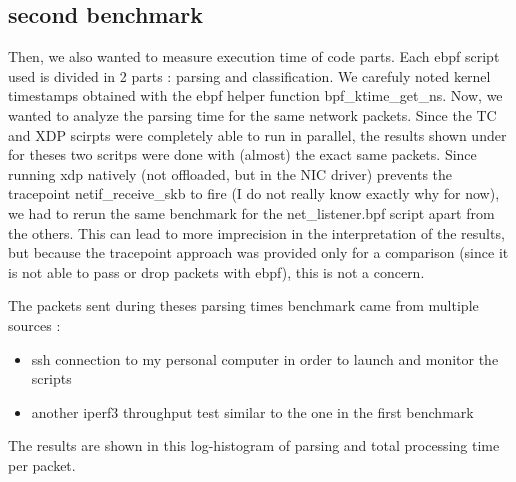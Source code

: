 \documentclass[conference]{IEEEtran}
\begin{document}
\subsection{second benchmark}
Then, we also wanted to measure execution time of code parts. Each ebpf script used is divided in 2 parts : parsing and classification. We carefuly noted kernel timestamps obtained with the ebpf helper function bpf\_ktime\_get\_ns. Now, we wanted to analyze the parsing time for the same network packets. Since the TC and XDP scirpts were completely able to run in parallel, the results shown under for theses two scritps were done with (almost) the exact same packets. Since running \gls{xdp} natively (not offloaded, but in the NIC driver) prevents the tracepoint netif\_receive\_skb to fire (I do not really know exactly why for now), we had to re\-run the same benchmark for the net\_listener.bpf script apart from the others. This can lead to more imprecision in the interpretation of the results, but because the tracepoint approach was provided only for a comparison (since it is not able to pass or drop packets with \gls{ebpf}), this is not a concern.

The packets sent during theses parsing times benchmark came from multiple sources :
\begin{itemize}
    \item ssh connection to my personal computer in order to launch and monitor the scripts
    \item another iperf3 throughput test similar to the one in the first benchmark
\end{itemize}

The results are shown in this log-histogram of parsing and total processing time per packet.




\end{document}
